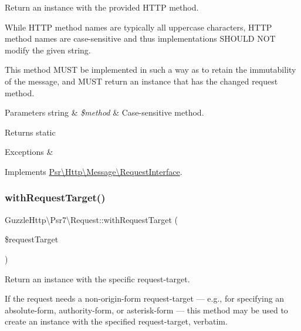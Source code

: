 Return an instance with the provided H\+T\+TP method.

While H\+T\+TP method names are typically all uppercase characters, H\+T\+TP method names are case-\/sensitive and thus implementations S\+H\+O\+U\+LD N\+OT modify the given string.

This method M\+U\+ST be implemented in such a way as to retain the immutability of the message, and M\+U\+ST return an instance that has the changed request method.


\begin{DoxyParams}[1]{Parameters}
string & {\em \$method} & Case-\/sensitive method. \\
\hline
\end{DoxyParams}
\begin{DoxyReturn}{Returns}
static 
\end{DoxyReturn}

\begin{DoxyExceptions}{Exceptions}
{\em } & \\
\hline
\end{DoxyExceptions}


Implements \hyperlink{interfacePsr_1_1Http_1_1Message_1_1RequestInterface_aa48dc3287b9848e0da3425973a60653e}{Psr\textbackslash{}\+Http\textbackslash{}\+Message\textbackslash{}\+Request\+Interface}.

\mbox{\label{classGuzzleHttp_1_1Psr7_1_1Request_aa05ac6946c5b3f50b5b136142ccf193f}} 
\subsubsection{\texorpdfstring{with\+Request\+Target()}{withRequestTarget()}}
{\footnotesize\ttfamily Guzzle\+Http\textbackslash{}\+Psr7\textbackslash{}\+Request\+::with\+Request\+Target (\begin{DoxyParamCaption}\item[{}]{\$request\+Target }\end{DoxyParamCaption})}

Return an instance with the specific request-\/target.

If the request needs a non-\/origin-\/form request-\/target — e.\+g., for specifying an absolute-\/form, authority-\/form, or asterisk-\/form — this method may be used to create an instance with the specified request-\/target, verbatim.

